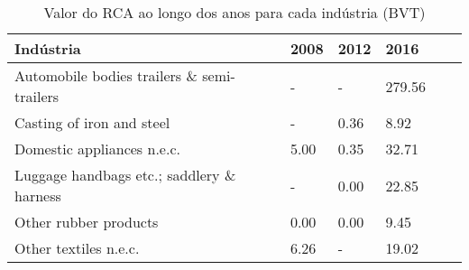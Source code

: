 \begin{table}
\centering
\caption{Valor do RCA ao longo dos anos para cada indústria (BVT)}
\begin{tabular}{p{6cm}p{1.5cm}p{1.5cm}p{1.5cm}p{1.5cm}p{1.5cm}}
\toprule
                                 Indústria & 2008 & 2012 &   2016 \\
\midrule
Automobile bodies trailers \& semi-trailers &    - &    - & 279.56 \\
                 Casting of iron and steel &    - & 0.36 &   8.92 \\
                Domestic appliances n.e.c. & 5.00 & 0.35 &  32.71 \\
 Luggage handbags etc.; saddlery \& harness &    - & 0.00 &  22.85 \\
                     Other rubber products & 0.00 & 0.00 &   9.45 \\
                     Other textiles n.e.c. & 6.26 &    - &  19.02 \\
\bottomrule
\end{tabular}
\end{table}
